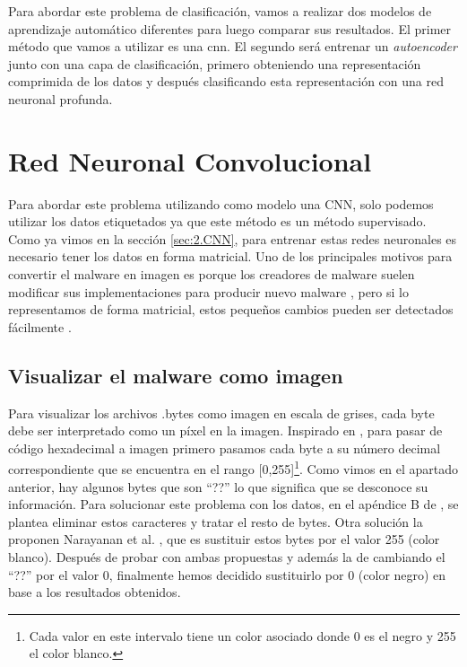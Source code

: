  


Para abordar este problema de clasificación, vamos a realizar dos modelos de aprendizaje automático diferentes para luego comparar sus resultados. El primer método que vamos a utilizar es una \acrfull{cnn}. El segundo será entrenar un \textit{autoencoder} junto con una capa de clasificación, primero obteniendo una representación comprimida de los datos y después clasificando esta representación con una red neuronal profunda. 
 







\section{Red Neuronal Convolucional} \label{3.cnn}

Para abordar este problema utilizando como modelo una CNN, solo podemos utilizar los datos etiquetados ya que este método es un método supervisado. Como ya vimos en la sección \ref{sec:2.CNN}, para entrenar estas redes neuronales es necesario tener los datos en forma matricial. Uno de los principales motivos para convertir el malware en imagen es porque los creadores de malware suelen modificar sus implementaciones para producir nuevo malware \citep{nataraj2015sattva}, pero si lo representamos de forma matricial, estos pequeños cambios pueden ser detectados fácilmente \citep{kalash2018malware}.

\subsection{Visualizar el malware como imagen}
Para visualizar los archivos .bytes como imagen en escala de grises, cada byte debe ser interpretado como un píxel en la imagen. Inspirado en \citep{nataraj2011malware}, para pasar de código hexadecimal a imagen primero pasamos cada byte a su número decimal correspondiente que se encuentra en el rango [0,255]\footnote{Cada valor en este intervalo tiene un color asociado donde 0 es el negro y 255 el color blanco.}. Como vimos en el apartado anterior, hay algunos bytes que son ``??'' lo que significa que se desconoce su información. Para solucionar este problema con los datos, en el apéndice B de \citep{geron2022hands}, se plantea eliminar estos caracteres y tratar el resto de bytes. Otra solución la proponen Narayanan et al. \citep{narayanan2016performance}, que es sustituir estos bytes por el valor 255 (color blanco). Después de probar con ambas propuestas y además la de cambiando el ``??'' por el valor 0, finalmente hemos decidido sustituirlo por 0 (color negro) en base a los resultados obtenidos. 

